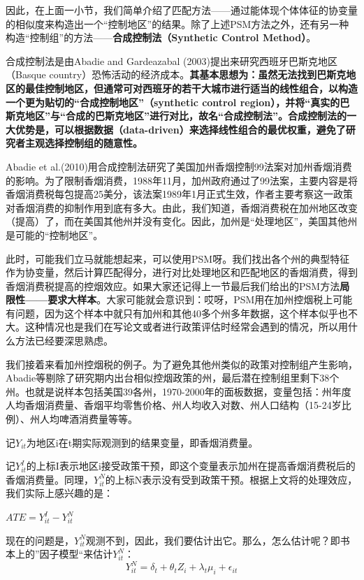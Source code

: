 \documentclass[cn,12pt,math=newtx,citestyle=gb7714-2015,bibstyle=gb7714-2015]{elegantbook}
\begin{document}
	因此，在上面一小节，我们简单介绍了匹配方法——通过能体现个体体征的协变量的相似度来构造出一个“控制地区”的结果。除了上述PSM方法之外，还有另一种构造“控制组”的方法——\textbf{合成控制法（Synthetic Control Method）}。
	
	合成控制法是由Abadie and Gardeazabal (2003)提出来研究西班牙巴斯克地区（Basque country）恐怖活动的经济成本。\textbf{其基本思想为：虽然无法找到巴斯克地区的最佳控制地区，但通常可对西班牙的若干大城市进行适当的线性组合，以构造一个更为贴切的“合成控制地区”（synthetic control region），并将“真实的巴斯克地区”与“合成的巴斯克地区”进行对比，故名“合成控制法”。合成控制法的一大优势是，可以根据数据（data-driven）来选择线性组合的最优权重，避免了研究者主观选择控制组的随意性。}
	
	Abadie et al.(2010)用合成控制法研究了美国加州香烟控制99法案对加州香烟消费的影响。为了限制香烟消费，1988年11月，加州政府通过了99法案，主要内容是将香烟消费税每包提高25美分，该法案1989年1月正式生效，作者主要考察这一政策对香烟消费的抑制作用到底有多大。由此，我们知道，香烟消费税在加州地区改变（提高）了，而在美国其他州并没有变化。因此，加州是“处理地区”，美国其他州是可能的“控制地区”。
	
	此时，可能我们立马就能想起来，可以使用PSM呀。我们找出各个州的典型特征作为协变量，然后计算匹配得分，进行对比处理地区和匹配地区的香烟消费，得到香烟消费税提高的控烟效应。如果大家还记得上一节最后我们给出的PSM方法\textbf{局限性——要求大样本}。大家可能就会意识到：哎呀，PSM用在加州控烟税上可能有问题，因为这个样本中就只有加州和其他40多个州多年数据，这个样本似乎也不大。这种情况也是我们在写论文或者进行政策评估时经常会遇到的情况，所以用什么方法已经要深思熟虑。
	
	我们接着来看加州控烟税的例子。为了避免其他州类似的政策对控制组产生影响，Abadie等剔除了研究期内出台相似控烟政策的州，最后潜在控制组里剩下38个州。也就是说样本包括美国39各州，1970-2000年的面板数据，变量包括：州年度人均香烟消费量、香烟平均零售价格、州人均收入对数、州人口结构（15-24岁比例）、州人均啤酒消费量等等。
	
	记$Y_{it}$为地区i在t期实际观测到的结果变量，即香烟消费量。
	
	记$Y_{it}^I$的上标I表示地区i接受政策干预，即这个变量表示加州在提高香烟消费税后的香烟消费量。同理，$Y_{it}^N$的上标N表示没有受到政策干预。根据上文将的处理效应，我们实际上感兴趣的是：
	\begin{center}
		$ATE=Y_{it}^I-Y_{it}^N$
	\end{center}
	
	现在的问题是，$Y_{it}^N$观测不到，因此，我们要估计出它。那么，怎么估计呢？即书本上的”因子模型“来估计$Y_{it}^N$：
	\begin{equation}
		Y_{it}^N=\delta_t+\theta_tZ_i+\lambda_t\mu_i+\epsilon_{it}
	\end{equation}
	
\end{document}
